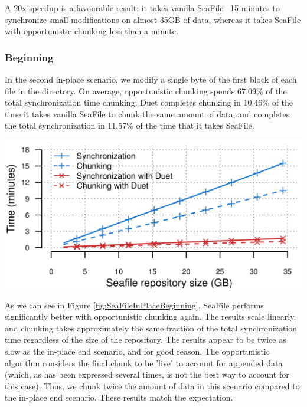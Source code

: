 \documentclass[table]{article}
\newenvironment{Figure}
  {\par\medskip\noindent\minipage{\linewidth}}
  {\endminipage\par\medskip}
\begin{document}
\begin{multicols}{2}
A 20x speedup is a favourable result: it takes vanilla SeaFile ~15 minutes to synchronize small modifications on almost 35GB of data, whereas it takes SeaFile with opportunistic chunking less than a minute.

\subsubsection{Beginning}

In the second in-place scenario, we modify a single byte of the first block of each file in the directory. On average, opportunistic chunking spends 67.09\% of the total synchronization time chunking. Duet completes chunking in 10.46\% of the time it takes vanilla SeaFile to chunk the same amount of data, and completes the total synchronization in 11.57\% of the time that it takes SeaFile.\\


\begin{Figure}
 \centering
 \includegraphics[width=\linewidth]{duet_in_place_beg.png}
 \label{fig:SeaFileInPlaceBeginning}
\end{Figure}

As we can see in Figure \ref{fig:SeaFileInPlaceBeginning}, SeaFile performs significantly better with opportunistic chunking again. The results scale linearly, and chunking takes approximately the same fraction of the total synchronization time regardless of the size of the repository. The results appear to be twice as slow as the in-place end scenario, and for good reason. The opportunistic algorithm considers the final chunk to be 'live' to account for appended data (which, as has been expressed several times, is not the best way to account for this case). Thus, we chunk twice the amount of data in this scenario compared to the in-place end scenario. These results match the expectation.


\end{multicols}
\end{document}
